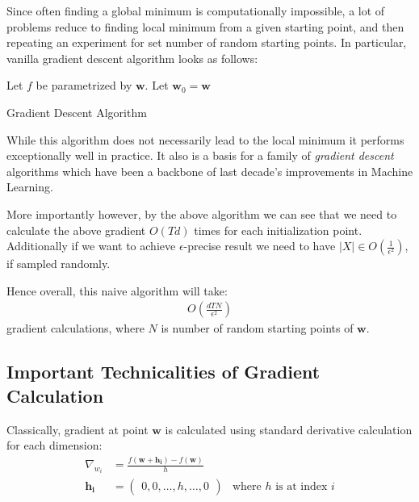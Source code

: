 \documentclass{article}
\begin{document}
Since often finding a global minimum is computationally impossible, a lot of problems reduce to finding local minimum from a given starting point,
and then repeating an experiment for set number of random starting points. In particular, vanilla gradient descent algorithm looks as follows:

\begin{algorithm}[H]
    \SetAlgoLined
    Let $f$ be parametrized by $\pmb{w}$. \;
    Let $\pmb{w}_0 = \pmb{w}$ \;
    \caption{Gradient Descent Algorithm}
    \label{alg:vanilla-grad-desc}
\end{algorithm}

While this algorithm does not necessarily lead to the local minimum it performs exceptionally well in practice. It also is a basis for a family of
\textit{gradient descent} algorithms which have been a backbone of last decade's improvements in Machine Learning.

More importantly however, by the above algorithm we can see that we need to calculate the above gradient $O(Td)$ times for each initialization point.
Additionally if we want to achieve $\epsilon$-precise result we need to have $|X| \in O(\frac{1}{\epsilon^2})$, if sampled randomly.

Hence overall, this naive algorithm will take:
\begin{align}
    O(\frac{dTN}{\epsilon^2})
    \label{eq:grad-desc-comp}
\end{align}
gradient calculations, where $N$ is number of random starting points of $\pmb{w}$.

\subsection{Important Technicalities of Gradient Calculation}
\label{subsec:tech-grad}

Classically, gradient at point $\pmb{w}$ is calculated using standard derivative calculation for each dimension:
\begin{align}
    \label{eq:grad1}
    \nabla_{w_i} &= \frac{f(\pmb{w} + \pmb{h_i}) - f(\pmb{w})}{h} \\
    \pmb{h_i} &= \begin{pmatrix}
        0, 0, \hdots, h, \hdots, 0
    \end{pmatrix} & \text{where $h$ is at index $i$}
\end{align}
\end{document}
